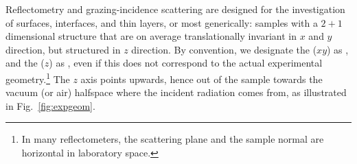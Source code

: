 Reflectometry and grazing-incidence scattering
are designed for the investigation of surfaces, interfaces, and thin layers,
or most generically:
samples with a $2+1$ dimensional structure
that are on average translationally invariant in $x$ and $y$ direction,
but structured in $z$ direction.
By convention,
we designate the  ($xy$) as ,
%
%
and the  ($z$) as ,
%
%
even if this does not correspond to the actual experimental geometry.\footnote
{In many reflectometers,
 the scattering plane and the sample normal are horizontal in laboratory space.}
The $z$ axis points upwards, hence out of the sample towards the
vacuum (or air) halfspace where the incident radiation comes from,
as illustrated in Fig.~\ref{fig:expgeom}.

